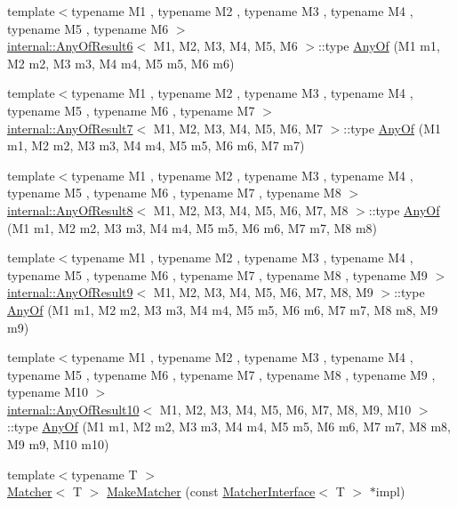 \begin{DoxyCompactItemize}
{\footnotesize template$<$typename M1 , typename M2 , typename M3 , typename M4 , typename M5 , typename M6 $>$ }\\\hyperlink{structtesting_1_1internal_1_1AnyOfResult6}{internal\+::\+Any\+Of\+Result6}$<$ M1, M2, M3, M4, M5, M6 $>$\+::type \hyperlink{namespacetesting_a747189264a49a426004366371f1a2575}{Any\+Of} (M1 m1, M2 m2, M3 m3, M4 m4, M5 m5, M6 m6)
\item 
{\footnotesize template$<$typename M1 , typename M2 , typename M3 , typename M4 , typename M5 , typename M6 , typename M7 $>$ }\\\hyperlink{structtesting_1_1internal_1_1AnyOfResult7}{internal\+::\+Any\+Of\+Result7}$<$ M1, M2, M3, M4, M5, M6, M7 $>$\+::type \hyperlink{namespacetesting_a754d1bddb237e79613f6834af3329efa}{Any\+Of} (M1 m1, M2 m2, M3 m3, M4 m4, M5 m5, M6 m6, M7 m7)
\item 
{\footnotesize template$<$typename M1 , typename M2 , typename M3 , typename M4 , typename M5 , typename M6 , typename M7 , typename M8 $>$ }\\\hyperlink{structtesting_1_1internal_1_1AnyOfResult8}{internal\+::\+Any\+Of\+Result8}$<$ M1, M2, M3, M4, M5, M6, M7, M8 $>$\+::type \hyperlink{namespacetesting_a9c979c62cc004664b14e0ce444e531d5}{Any\+Of} (M1 m1, M2 m2, M3 m3, M4 m4, M5 m5, M6 m6, M7 m7, M8 m8)
\item 
{\footnotesize template$<$typename M1 , typename M2 , typename M3 , typename M4 , typename M5 , typename M6 , typename M7 , typename M8 , typename M9 $>$ }\\\hyperlink{structtesting_1_1internal_1_1AnyOfResult9}{internal\+::\+Any\+Of\+Result9}$<$ M1, M2, M3, M4, M5, M6, M7, M8, M9 $>$\+::type \hyperlink{namespacetesting_a873c812db953aebd4bf2ffbff0e8d770}{Any\+Of} (M1 m1, M2 m2, M3 m3, M4 m4, M5 m5, M6 m6, M7 m7, M8 m8, M9 m9)
\item 
{\footnotesize template$<$typename M1 , typename M2 , typename M3 , typename M4 , typename M5 , typename M6 , typename M7 , typename M8 , typename M9 , typename M10 $>$ }\\\hyperlink{structtesting_1_1internal_1_1AnyOfResult10}{internal\+::\+Any\+Of\+Result10}$<$ M1, M2, M3, M4, M5, M6, M7, M8, M9, M10 $>$\+::type \hyperlink{namespacetesting_a1797921d3ed04c7f13dfa8f36bf0bf1c}{Any\+Of} (M1 m1, M2 m2, M3 m3, M4 m4, M5 m5, M6 m6, M7 m7, M8 m8, M9 m9, M10 m10)
\item 
{\footnotesize template$<$typename T $>$ }\\\hyperlink{classtesting_1_1Matcher}{Matcher}$<$ T $>$ \hyperlink{namespacetesting_a37fd8029ac00e60952440a3d9cca8166}{Make\+Matcher} (const \hyperlink{classtesting_1_1MatcherInterface}{Matcher\+Interface}$<$ T $>$ $\ast$impl)

\end{DoxyCompactItemize}
